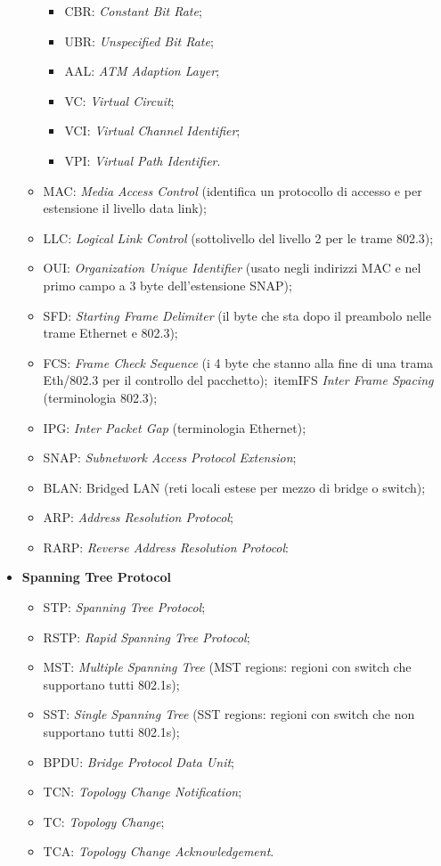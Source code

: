 \begin{itemize}
\begin{itemize}
\begin{itemize}
\item{CBR}: \emph{Constant Bit Rate};
\item{UBR}: \emph{Unspecified Bit Rate};
\item{AAL}: \emph{ATM Adaption Layer};
\item{VC}: \emph{Virtual Circuit};
\item{VCI}: \emph{Virtual Channel Identifier};
\item{VPI}: \emph{Virtual Path Identifier}.

\end{itemize}

\item{MAC}: \emph{Media Access Control} (identifica un protocollo di accesso e per estensione il livello data link);
\item{LLC}: \emph{Logical Link Control} (sottolivello del livello 2 per le trame 802.3); \item{OUI}: \emph{Organization Unique Identifier} (usato negli indirizzi MAC e nel primo campo a 3 byte dell’estensione SNAP);
\item{SFD}: \emph{Starting Frame Delimiter} (il byte che sta dopo il preambolo nelle trame Ethernet e 802.3);
\item{FCS}: \emph{Frame Check Sequence} (i 4 byte che stanno alla fine di una trama Eth/802.3 per il controllo del pacchetto);\
item{IFS} \emph{Inter Frame Spacing} (terminologia 802.3);
\item{IPG}: \emph{Inter Packet Gap} (terminologia Ethernet);
\item{SNAP}: \emph{Subnetwork Access Protocol Extension};
\item{BLAN}: Bridged LAN (reti locali estese per mezzo di bridge o switch);
\item{ARP}: \emph{Address Resolution Protocol};
\item{RARP}: \emph{Reverse Address Resolution Protocol}:

\end{itemize}

\item{\textbf{Spanning Tree Protocol}}

\begin{itemize}

\item{STP}: \emph{Spanning Tree Protocol};
\item{RSTP}: \emph{Rapid Spanning Tree Protocol};
\item{MST}: \emph{Multiple Spanning Tree} (MST regions: regioni con switch che supportano tutti 802.1s);
\item{SST}: \emph{Single Spanning Tree} (SST regions: regioni con switch che non supportano tutti 802.1s);
\item{BPDU}: \emph{Bridge Protocol Data Unit};
\item{TCN}: \emph{Topology Change Notification};
\item{TC}: \emph{Topology Change};
\item{TCA}: \emph{Topology Change Acknowledgement}.


\end{itemize}
\end{itemize}
